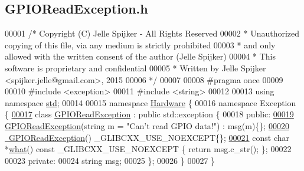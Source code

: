 \hypertarget{_g_p_i_o_read_exception_8h_source}{}\subsection{G\+P\+I\+O\+Read\+Exception.\+h}
\label{_g_p_i_o_read_exception_8h_source}

\begin{DoxyCode}
00001 \textcolor{comment}{/* Copyright (C) Jelle Spijker - All Rights Reserved}
00002 \textcolor{comment}{ * Unauthorized copying of this file, via any medium is strictly prohibited}
00003 \textcolor{comment}{ * and only allowed with the written consent of the author (Jelle Spijker)}
00004 \textcolor{comment}{ * This software is proprietary and confidential}
00005 \textcolor{comment}{ * Written by Jelle Spijker <spijker.jelle@gmail.com>, 2015}
00006 \textcolor{comment}{ */}
00007 
00008 \textcolor{preprocessor}{#pragma once}
00009 
00010 \textcolor{preprocessor}{#include <exception>}
00011 \textcolor{preprocessor}{#include <string>}
00012 
00013 \textcolor{keyword}{using namespace }\hyperlink{namespacestd}{std};
00014 
00015 \textcolor{keyword}{namespace }\hyperlink{namespace_hardware}{Hardware} \{
00016 \textcolor{keyword}{namespace }Exception \{
\hypertarget{_g_p_i_o_read_exception_8h_source_l00017}{}\hyperlink{class_hardware_1_1_exception_1_1_g_p_i_o_read_exception}{00017} \textcolor{keyword}{class }\hyperlink{class_hardware_1_1_exception_1_1_g_p_i_o_read_exception}{GPIOReadException} : \textcolor{keyword}{public} std::exception \{
00018 \textcolor{keyword}{public}:
\hypertarget{_g_p_i_o_read_exception_8h_source_l00019}{}\hyperlink{class_hardware_1_1_exception_1_1_g_p_i_o_read_exception_a689a2d0cefc6eb5528ad6e7200fbf5f5}{00019}   \hyperlink{class_hardware_1_1_exception_1_1_g_p_i_o_read_exception_a689a2d0cefc6eb5528ad6e7200fbf5f5}{GPIOReadException}(\textcolor{keywordtype}{string} m = \textcolor{stringliteral}{"Can't read GPIO data!"}) : msg(m)\{\};
\hypertarget{_g_p_i_o_read_exception_8h_source_l00020}{}\hyperlink{class_hardware_1_1_exception_1_1_g_p_i_o_read_exception_a97a5da2dc97609b2168a53f52589a0fb}{00020}   \hyperlink{class_hardware_1_1_exception_1_1_g_p_i_o_read_exception_a97a5da2dc97609b2168a53f52589a0fb}{~GPIOReadException}() \_GLIBCXX\_USE\_NOEXCEPT\{\};
\hypertarget{_g_p_i_o_read_exception_8h_source_l00021}{}\hyperlink{class_hardware_1_1_exception_1_1_g_p_i_o_read_exception_a45c94f4cf40537716cf7c0acfe3ebe29}{00021}   \textcolor{keyword}{const} \textcolor{keywordtype}{char} *\hyperlink{class_hardware_1_1_exception_1_1_g_p_i_o_read_exception_a45c94f4cf40537716cf7c0acfe3ebe29}{what}() const \_GLIBCXX\_USE\_NOEXCEPT \{ \textcolor{keywordflow}{return} msg.c\_str(); \};
00022 
00023 \textcolor{keyword}{private}:
00024   \textcolor{keywordtype}{string} msg;
00025 \};
00026 \}
00027 \}
\end{DoxyCode}
